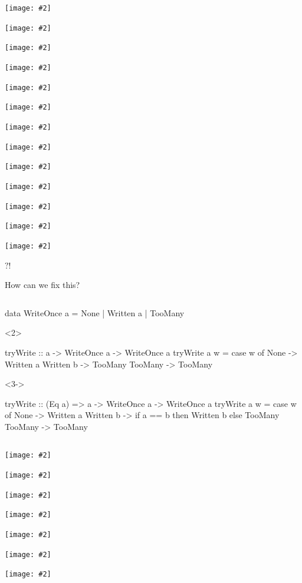 \documentclass[UKenglish,usenames,dvipsnames,svgnames,table,aspectratio=169,mathserif]{beamer}
\newcommand{\nl}{\vspace{\baselineskip}}
\newcommand{\imageslide}[2][1]{{
\begin{frame}\begin{center}
\texttt{[image: \#2]}
\end{center}\end{frame}
}}
\begin{document}
\imageslide[0.8]{celsius/celsius5.pdf}
\imageslide[0.8]{celsius/celsius6.pdf}
\imageslide[0.8]{celsius/celsius7.pdf}
\imageslide[0.8]{celsius/celsius8.pdf}


\imageslide{oscillator0.pdf}
\imageslide{oscillator1.pdf}
\imageslide{oscillator2.pdf}
\imageslide{oscillator3.pdf}
\imageslide{oscillator4.pdf}
\imageslide{oscillator5.pdf}
\imageslide{oscillator6.pdf}
\imageslide{oscillator7.pdf}
\imageslide{oscillator8.pdf}


\begin{frame}
\centering
\fontsize{60}{70}\selectfont $?!$

\end{frame}


\begin{frame}
\centering \huge

How can we fix this?
\end{frame}


\begin{frame}[fragile]
\begin{columns}
\begin{overlayarea}{\textwidth}{0.6\textheight}
\begin{haskellcode}
data WriteOnce a
  = None
  | Written a
  | TooMany
\end{haskellcode}

\nl

\begin{onlyenv}<2>
\begin{haskellcode}
tryWrite ::           a -> WriteOnce a -> WriteOnce a
tryWrite a w = case w of
  None      -> Written a
  Written b -> TooMany
  TooMany   -> TooMany
\end{haskellcode}
\end{onlyenv}

\begin{onlyenv}<3->
\begin{haskellcode}
tryWrite :: (Eq a) => a -> WriteOnce a -> WriteOnce a
tryWrite a w = case w of
  None      -> Written a
  Written b -> if a == b then Written b else TooMany
  TooMany   -> TooMany
\end{haskellcode}
\end{onlyenv}
\end{overlayarea}
\end{columns}
\end{frame}


\imageslide{oscillator-fixed1.pdf}
\imageslide{oscillator-fixed2.pdf}
\imageslide{oscillator-fixed3.pdf}
\imageslide{oscillator-fixed4.pdf}
\imageslide{oscillator-fixed5.pdf}
\imageslide{oscillator-fixed6.pdf}
\imageslide{oscillator-fixed7.pdf}
\end{document}
